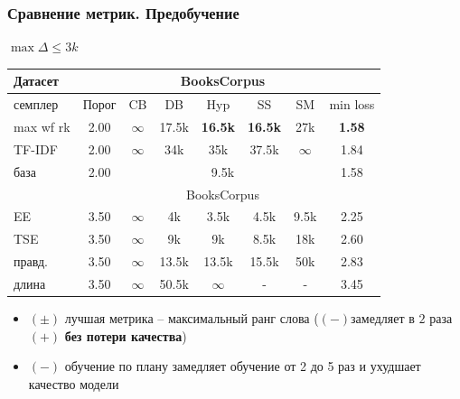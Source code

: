\documentclass{beamer}
\begin{document}
\begin{frame}
	\frametitle{Сравнение метрик. Предобучение}
	$\max\Delta \le 3k$
	\begin{table}
		\begin{tabular}{l|c|ccccc|c}
			Датасет & & \multicolumn{5}{c}{BooksCorpus} &\\
			\hline
			семплер & Порог & CB & DB & Hyp & SS & SM & min loss\\
			\hline
			max wf rk & 2.00 & $\infty$ & 17.5k & {\bf 16.5k} & {\bf 16.5k} & 27k & {\bf 1.58} \\
			TF-IDF & 2.00 & $\infty$ & 34k & 35k & 37.5k & $\infty$ & 1.84 \\
			\hline
			база & 2.00 & \multicolumn{5}{c}{9.5k} & 1.58 \\
			\hline
			\hline
			& & \multicolumn{5}{c}{BooksCorpus} & \\
			\hline
			EE & 3.50 & $\infty$ & 4k & 3.5k & 4.5k & 9.5k & 2.25 \\
			TSE & 3.50 & $\infty$ & 9k & 9k & 8.5k & 18k & 2.60 \\
			правд. & 3.50 & $\infty$ & 13.5k & 13.5k & 15.5k & 50k & 2.83 \\
			длина & 3.50 & $\infty$ & 50.5k & $\infty$ & - & - & 3.45 \\
			\hline
		\end{tabular}
	\end{table}
	\begin{itemize}
		\item {\bf\color{orange}$(\pm)$} лучшая метрика -- максимальный ранг слова ({\bf\color{red}$(-)$}замедляет в $2$ раза {\bf\color{green}$(+)$} {\bf без потери качества})
		\item {\bf\color{red}$(-)$} обучение по плану замедляет обучение от 2 до 5 раз и ухудшает качество модели
	\end{itemize}
\end{frame}
\end{document}
